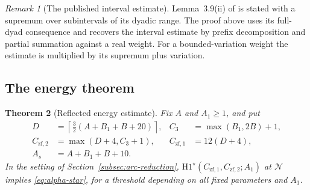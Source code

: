 \documentclass[11pt]{article}
\newtheorem{theorem}{Theorem}[section]
\theoremstyle{definition}
\newcommand{\GN}{\mathcal N}
\theoremstyle{remark}
\newtheorem{remark}[theorem]{Remark}
\numberwithin{equation}{section}
\begin{document}
\begin{remark}[The published interval estimate]
Lemma~3.9(ii) of \cite[p.~46]{MSTT} is stated with a supremum
over subintervals of its dyadic range. The proof above uses its
full-dyad consequence and recovers the interval estimate by prefix
decomposition and partial summation against a real weight.
For a bounded-variation weight the estimate is multiplied by its
supremum plus variation.
\end{remark}

\subsection{The energy theorem}\label{subsec:A}
\begin{theorem}[Reflected energy estimate]\label{thm:energy}
Fix $A$ and $A_1\ge1$, and put
\begin{equation}\label{eq:A-constants}
 \begin{aligned}
 D&=\left\lceil\frac32(A+B_1+B+20)\right\rceil,
 & C_3&=\max(B_1,2B)+1,\\
 C_{\mathrm{zf},2}&=\max(D+4,C_3+1),
 & C_{\mathrm{zf},1}&=12(D+4),\\
 A_s&=A+B_1+B+10.
 \end{aligned}
\end{equation}
In the setting of Section~\ref{subsec:arc-reduction},
$\mathrm H1^\star(C_{\mathrm{zf},1},C_{\mathrm{zf},2};A_1)$ at $\GN$
implies \eqref{eq:alpha-star}, for a threshold depending on all
fixed parameters and $A_1$.
\end{theorem}
\end{document}
